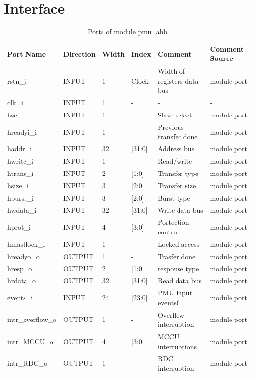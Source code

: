 \section{Interface}\label{interface}
\label{chapter 4}

\begin{table}[ht]
	\scriptsize
	\centering
	\begin{tabular}{llllll}
		\hline
		Port Name & Direction & Width & Index & Comment & Comment Source
		\\
		\hline
		rstn\_i & INPUT & 1 & Clock & Width of registers data bus & module port
		\\
		clk\_i & INPUT & 1 & - & - & -\\
		hsel\_i & INPUT & 1 & - & Slave select & module port
		\\
		hreadyi\_i & INPUT & 1 & - & Previous transfer done & module port
		\\
		haddr\_i & INPUT & 32 & [31:0] & Address bus & module port
		\\
		hwrite\_i & INPUT & 1 & - & Read/write & module port
		\\
		htrans\_i & INPUT & 2 & [1:0] & Transfer type & module port
		\\
		hsize\_i & INPUT & 3 & [2:0] & Transfer size & module port
		\\
		hburst\_i & INPUT & 3 & [2:0] & Burst type & module port
		\\
		hwdata\_i & INPUT & 32 & [31:0] & Write data bus & module port
		\\
		hprot\_i & INPUT & 4 & [3:0] & Portection control & module port
		\\
		hmastlock\_i & INPUT & 1 & - & Locked access & module port
		\\
		hreadyo\_o & OUTPUT & 1 & - & Trasfer done & module port
		\\
		hresp\_o & OUTPUT & 2 & [1:0] & response type & module port
		\\
		hrdata\_o & OUTPUT & 32 & [31:0] & Read data bus & module port
		\\
		events\_i & INPUT & 24 & [23:0] & PMU input events6 & module port
		\\
		intr\_overflow\_o & OUTPUT & 1 & - & Overflow interruption & module port
		\\
		intr\_MCCU\_o & OUTPUT & 4 & [3:0] & MCCU interruptions & module port
		\\
		intr\_RDC\_o & OUTPUT & 1 & - & RDC interruption & module port
		\\
		\hline
	\end{tabular}
	\caption{Ports of module pmu\_ahb}
	\label{port:pmu_ahb}
\end{table}

